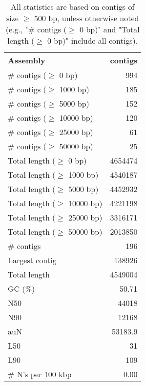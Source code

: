 \documentclass[12pt,a4paper]{article}
\begin{document}
\begin{table}[ht]
\begin{center}
\caption{All statistics are based on contigs of size $\geq$ 500 bp, unless otherwise noted (e.g., "\# contigs ($\geq$ 0 bp)" and "Total length ($\geq$ 0 bp)" include all contigs).}
\begin{tabular}{|l*{1}{|r}|}
\hline
Assembly & contigs \\ \hline
\# contigs ($\geq$ 0 bp) & 994 \\ \hline
\# contigs ($\geq$ 1000 bp) & 185 \\ \hline
\# contigs ($\geq$ 5000 bp) & 152 \\ \hline
\# contigs ($\geq$ 10000 bp) & 120 \\ \hline
\# contigs ($\geq$ 25000 bp) & 61 \\ \hline
\# contigs ($\geq$ 50000 bp) & 25 \\ \hline
Total length ($\geq$ 0 bp) & 4654474 \\ \hline
Total length ($\geq$ 1000 bp) & 4540187 \\ \hline
Total length ($\geq$ 5000 bp) & 4452932 \\ \hline
Total length ($\geq$ 10000 bp) & 4221198 \\ \hline
Total length ($\geq$ 25000 bp) & 3316171 \\ \hline
Total length ($\geq$ 50000 bp) & 2013850 \\ \hline
\# contigs & 196 \\ \hline
Largest contig & 138926 \\ \hline
Total length & 4549004 \\ \hline
GC (\%) & 50.71 \\ \hline
N50 & 44018 \\ \hline
N90 & 12168 \\ \hline
auN & 53183.9 \\ \hline
L50 & 31 \\ \hline
L90 & 109 \\ \hline
\# N's per 100 kbp & 0.00 \\ \hline
\end{tabular}
\end{center}
\end{table}
\end{document}
